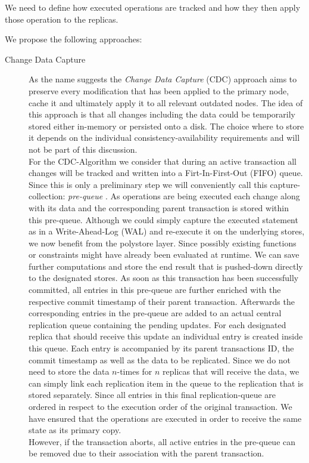 We need to define how executed operations are tracked and how they then apply those operation to the replicas. 

We propose the following approaches: \\

\begin{description}
    \item [Change Data Capture]
     As the name suggests the \emph{Change Data Capture} (CDC) approach aims to preserve every modification that has been applied to the primary node, cache it and ultimately
    apply it to all relevant outdated nodes. 
    The idea of this approach is that all changes including the data could be temporarily stored either in-memory or persisted onto a disk.
    The choice where to store it depends on the individual consistency-availability requirements and will not be part of this discussion.\\
    For the CDC-Algorithm we consider that during an active transaction all changes will be tracked and written into a Firt-In-First-Out (FIFO) queue.
    Since this is only a preliminary step we will conveniently call this capture-collection: \emph{pre-queue} .
    As operations are being executed each change along with its data and the corresponding parent transaction is stored within this pre-queue.
    Although we could simply capture the executed statement as in a Write-Ahead-Log (WAL) and re-execute it on the underlying stores, we now benefit from the polystore layer.
    Since possibly existing functions or constraints might have already been evaluated at runtime. We can save further computations and store the end result that is pushed-down directly
    to the designated stores. As soon as this transaction has been successfully committed, all entries in this pre-queue are further enriched with the respective commit timestamp of their parent transaction.
    Afterwards the corresponding entries in the pre-queue are added to an actual central replication queue containing the pending updates.
    For each designated replica that should receive this update an individual entry is created inside this queue. 
    Each entry is accompanied by its parent transactions ID, the commit timestamp as well as the data to be replicated.
    Since we do not need to store the data $n$-times for $n$ replicas that will receive the data, we can simply link each replication item in the queue to the replication 
    that is stored separately. 
    Since all entries in this final replication-queue are ordered in respect to the execution order of the original transaction.
    We have ensured that the operations are executed in order to receive the same state as its primary copy.\\ 
    However, if the transaction aborts, all active entries in the pre-queue can be removed due to their association with the parent transaction.\\
    

\end{description}
